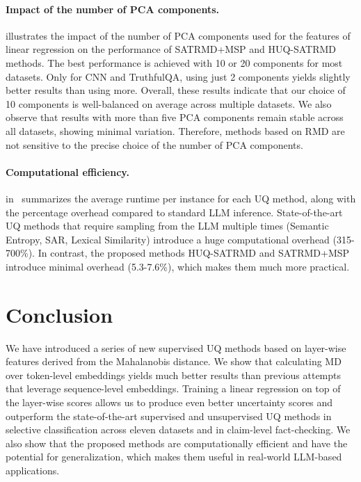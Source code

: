 \documentclass[11pt]{article}
\begin{document}
\paragraph{Impact of the number of PCA components.}
   illustrates the impact of the number of PCA components used for the features of linear regression on the performance of SATRMD+MSP and HUQ-SATRMD methods. The best performance is achieved with 10 or 20 components for most datasets. Only for CNN and TruthfulQA, using just 2 components yields slightly better results than using more. Overall, these results indicate that our choice of 10 components is well-balanced on average across multiple datasets. We also observe that results with more than five PCA components remain stable across all datasets, showing minimal variation. Therefore, methods based on RMD are not sensitive to the precise choice of the number of PCA components.

\paragraph{Computational efficiency.}
   in~ summarizes the average runtime per instance for each UQ method, along with the percentage overhead compared to standard LLM inference. State-of-the-art UQ methods that require sampling from the LLM multiple times (Semantic Entropy, SAR, Lexical Similarity) introduce a huge computational overhead (315-700\%). In contrast, the proposed methods HUQ-SATRMD and SATRMD+MSP introduce minimal overhead (5.3-7.6\%), which makes them much more practical.

 

\section{Conclusion}
  We have introduced a series of new supervised UQ methods based on layer-wise features derived from the Mahalanobis distance. We show that calculating MD over token-level embeddings yields much better results than previous attempts that leverage sequence-level embeddings. Training a linear regression on top of the layer-wise scores allows us to produce even better uncertainty scores and outperform the state-of-the-art supervised and unsupervised UQ methods in selective classification across eleven datasets and in claim-level fact-checking.
  We also show that the proposed methods are computationally efficient and have the potential for generalization, which makes them useful in real-world LLM-based applications.
\end{document}
